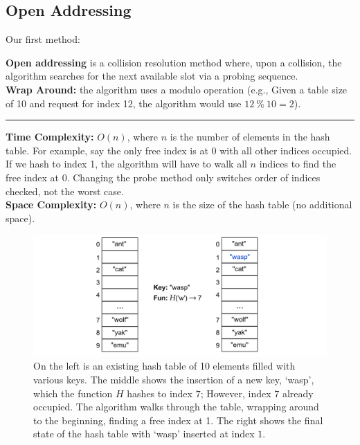 \subsection{Open Addressing}
\noindent
Our first method:
\begin{Def}

    \textbf{Open addressing} is a collision resolution method where, upon a collision, the algorithm searches for the next available slot via a probing sequence.\\

    \noindent
    \textbf{Wrap Around:} the algorithm uses a modulo operation (e.g., Given a table size of 10 and request for index 12, the algorithm would use $12\ \%\ 10 = 2$).
    
    \noindent
    \rule{\textwidth}{0.4pt}

    \noindent
    \textbf{Time Complexity:} $O(n)$, where $n$ is the number of elements in the hash table. For example, say the only free index is at 0 with all other
    indices occupied. If we hash to index 1, the algorithm will have to walk all $n$ indices to find the free index at 0. Changing the probe method only switches order of indices checked, not the worst case.\\
    \textbf{Space Complexity:} $O(n)$, where $n$ is the size of the hash table (no additional space).
\end{Def}

\begin{figure}[ht!]

    \centering
    \includegraphics[width=\textwidth]{Sections/hash/open_addressing.png}
    \caption{On the left is an existing hash table of 10 elements filled with various keys. The middle shows the insertion of a new key,
    `wasp', which the function $H$ hashes to index $7$; However, index $7$ already occupied. The algorithm walks through the table, wrapping around
    to the beginning, finding a free index at 1. The right shows the final state of the hash table with `wasp' inserted at index $1$.}
    \label{fig:open_addressing}
\end{figure}

